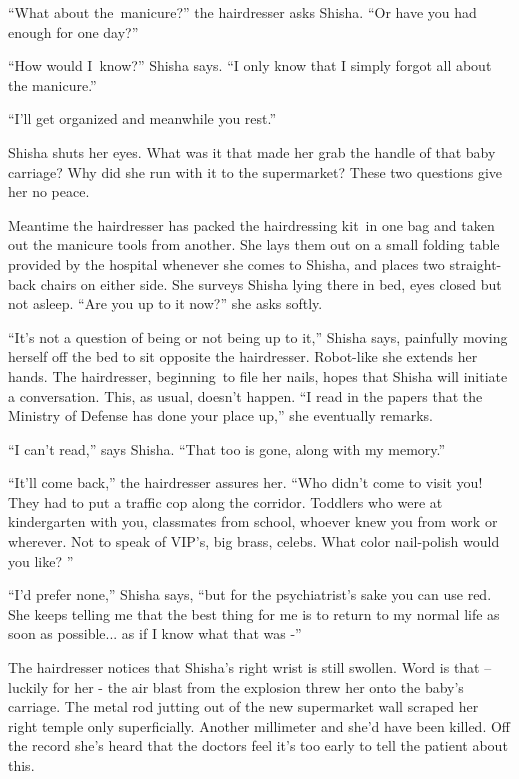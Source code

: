 \documentclass[twoside,11pt]{book}
\begin{document}
``What about the~manicure?'' the hairdresser asks Shisha. ``Or have you had
enough for one day?''

``How would I~know?'' Shisha says. ``I only know that I simply forgot all about
the manicure.''

``I'll get organized and meanwhile you rest.''

Shisha shuts her eyes. What was it that made her grab the handle of that baby carriage? Why did she run with it to the
supermarket? These two questions give her no peace.

Meantime the hairdresser has packed the hairdressing kit~in one bag and taken out the manicure tools from another. She
lays them out on a small folding table provided by the hospital whenever she comes to Shisha, and places two
straight-back chairs on either side. She surveys Shisha lying there in bed, eyes closed but not asleep.
``Are you up to it now?'' she asks softly.

``It's not a question of being or not being up to it,'' Shisha says, painfully{
}moving herself off the bed to sit opposite the hairdresser. Robot-like she extends her hands. The hairdresser,
beginning~to file her nails, hopes that Shisha will initiate a conversation. This, as usual, doesn't happen.
``I read in the papers that the Ministry of Defense has done your place up,'' she eventually
remarks.

``I can't read,'' says Shisha. ``That too is gone, along with my
memory.''

``It'll come back,'' the hairdresser assures her. ``Who didn't come to visit you!
They had to put a traffic cop along the corridor. Toddlers who were at kindergarten with you, classmates from school,
whoever knew you from work or wherever. Not to speak of VIP's, big brass, celebs. What color nail-polish would you
like? ''

``I'd{ }prefer none,'' Shisha says, ``but
for the psychiatrist's sake you can use red. She keeps telling me that the best thing for me is to return to my normal
life as soon as possible... as if I know what that was -'' ~

The hairdresser notices that Shisha's right wrist is still swollen. Word is that -- luckily for her - the air blast from
the explosion threw her onto the baby's carriage. The metal rod jutting out of the new supermarket wall scraped her
right temple only superficially. Another millimeter and she'd have been killed. Off the record she's heard that the
doctors feel it's too early to tell the patient about this.
\end{document}
